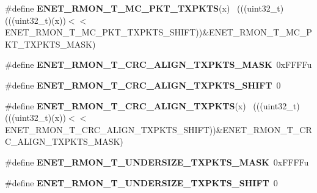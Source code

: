 \begin{DoxyCompactItemize}
\item 
\hypertarget{group___e_n_e_t___register___masks_ga499a20363bb658aa5a6e3cacdf4b7d40}{}\#define {\bfseries E\+N\+E\+T\+\_\+\+R\+M\+O\+N\+\_\+\+T\+\_\+\+M\+C\+\_\+\+P\+K\+T\+\_\+\+T\+X\+P\+K\+T\+S}(x)                      ~(((uint32\+\_\+t)(((uint32\+\_\+t)(x))$<$$<$E\+N\+E\+T\+\_\+\+R\+M\+O\+N\+\_\+\+T\+\_\+\+M\+C\+\_\+\+P\+K\+T\+\_\+\+T\+X\+P\+K\+T\+S\+\_\+\+S\+H\+I\+F\+T))\&E\+N\+E\+T\+\_\+\+R\+M\+O\+N\+\_\+\+T\+\_\+\+M\+C\+\_\+\+P\+K\+T\+\_\+\+T\+X\+P\+K\+T\+S\+\_\+\+M\+A\+S\+K)\label{group___e_n_e_t___register___masks_ga499a20363bb658aa5a6e3cacdf4b7d40}

\item 
\hypertarget{group___e_n_e_t___register___masks_gacccd1e251e3c6aa0159af65a0aee2772}{}\#define {\bfseries E\+N\+E\+T\+\_\+\+R\+M\+O\+N\+\_\+\+T\+\_\+\+C\+R\+C\+\_\+\+A\+L\+I\+G\+N\+\_\+\+T\+X\+P\+K\+T\+S\+\_\+\+M\+A\+S\+K}~0x\+F\+F\+F\+Fu\label{group___e_n_e_t___register___masks_gacccd1e251e3c6aa0159af65a0aee2772}

\item 
\hypertarget{group___e_n_e_t___register___masks_ga2736c6ffc11baa5ce09a120c967841e1}{}\#define {\bfseries E\+N\+E\+T\+\_\+\+R\+M\+O\+N\+\_\+\+T\+\_\+\+C\+R\+C\+\_\+\+A\+L\+I\+G\+N\+\_\+\+T\+X\+P\+K\+T\+S\+\_\+\+S\+H\+I\+F\+T}~0\label{group___e_n_e_t___register___masks_ga2736c6ffc11baa5ce09a120c967841e1}

\item 
\hypertarget{group___e_n_e_t___register___masks_gaffae657480298731e806c101974967f0}{}\#define {\bfseries E\+N\+E\+T\+\_\+\+R\+M\+O\+N\+\_\+\+T\+\_\+\+C\+R\+C\+\_\+\+A\+L\+I\+G\+N\+\_\+\+T\+X\+P\+K\+T\+S}(x)                ~(((uint32\+\_\+t)(((uint32\+\_\+t)(x))$<$$<$E\+N\+E\+T\+\_\+\+R\+M\+O\+N\+\_\+\+T\+\_\+\+C\+R\+C\+\_\+\+A\+L\+I\+G\+N\+\_\+\+T\+X\+P\+K\+T\+S\+\_\+\+S\+H\+I\+F\+T))\&E\+N\+E\+T\+\_\+\+R\+M\+O\+N\+\_\+\+T\+\_\+\+C\+R\+C\+\_\+\+A\+L\+I\+G\+N\+\_\+\+T\+X\+P\+K\+T\+S\+\_\+\+M\+A\+S\+K)\label{group___e_n_e_t___register___masks_gaffae657480298731e806c101974967f0}

\item 
\hypertarget{group___e_n_e_t___register___masks_gac79ab5e21dda24e10c602a553f1096bb}{}\#define {\bfseries E\+N\+E\+T\+\_\+\+R\+M\+O\+N\+\_\+\+T\+\_\+\+U\+N\+D\+E\+R\+S\+I\+Z\+E\+\_\+\+T\+X\+P\+K\+T\+S\+\_\+\+M\+A\+S\+K}~0x\+F\+F\+F\+Fu\label{group___e_n_e_t___register___masks_gac79ab5e21dda24e10c602a553f1096bb}

\item 
\hypertarget{group___e_n_e_t___register___masks_ga1e9b9d2818563f7ddb3d266af3e5bbfd}{}\#define {\bfseries E\+N\+E\+T\+\_\+\+R\+M\+O\+N\+\_\+\+T\+\_\+\+U\+N\+D\+E\+R\+S\+I\+Z\+E\+\_\+\+T\+X\+P\+K\+T\+S\+\_\+\+S\+H\+I\+F\+T}~0\label{group___e_n_e_t___register___masks_ga1e9b9d2818563f7ddb3d266af3e5bbfd}


\end{DoxyCompactItemize}
